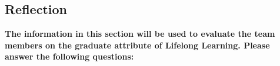 \documentclass[12pt, titlepage]{article}
\begin{document}




\subsection{Reflection}

\textbf{The information in this section will be used to evaluate the team members on the graduate attribute
	of Lifelong Learning. Please answer the following questions:}
\end{document}
